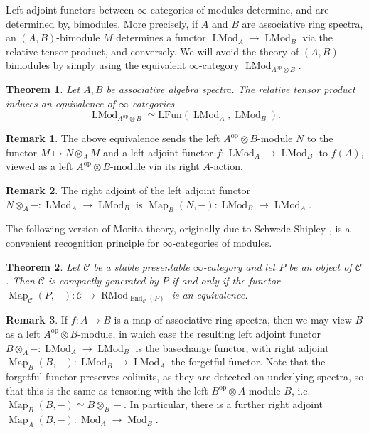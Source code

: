 \documentclass{article}
\newtheorem{theorem}{Theorem}[subsection]
\theoremstyle{definition}
\newtheorem{remark}{Remark}[subsection]
\newcommand{\C}{\mathcal{C}}
\renewcommand{\i}{\infty}
\newcommand{\op}{\mathrm{op}}
\DeclareMathOperator{\LMod}{LMod}
\DeclareMathOperator{\RMod}{RMod}
\DeclareMathOperator{\Mod}{Mod}
\DeclareMathOperator{\End}{End}
\newcommand{\Funl}{\mathrm{LFun}}
\DeclareMathOperator{\Map}{Map}
\begin{document}
Left adjoint functors between $\i$-categories of modules determine, and are determined by, bimodules.
More precisely, if $A$ and $B$ are associative ring spectra, an $(A,B)$-bimodule $M$ determines a functor $\LMod_A\to\LMod_B$ via the relative tensor product, and conversely.
We will avoid the theory of $(A,B)$-bimodules by simply using the equivalent $\infty$-category $\LMod_{A^{\op}\otimes B}$.
\begin{theorem}{\em \cite[Theorem 7.1.2.4]{HA}}
Let $A, B$ be associative algebra spectra.
The relative tensor product induces an equivalence of $\i$-categories
\[
\LMod_{A^{\op}\otimes B}\simeq\Funl(\LMod_A,\LMod_B).
\]
\end{theorem}
\begin{remark}
The above equivalence sends the left $A^{\op}\otimes B$-module $N$ to the functor $M\mapsto N\otimes_A M$ and a left adjoint functor $f:\LMod_A\to\LMod_B$ to $f(A)$, viewed as a left $A^{\op}\otimes B$-module via its right $A$-action.
\end{remark}

\begin{remark}
The right adjoint of the left adjoint functor $N\otimes_A -:\LMod_A\to\LMod_B$ is $\Map_B(N,-):\LMod_B\to\LMod_A$.
\end{remark}

The following version of Morita theory, originally due to Schwede-Shipley \cite{SS}, is a convenient recognition principle for $\infty$-categories of modules.

\begin{theorem}{\em \cite[Theorem 7.1.2.1]{HA}}
Let $\C$ be a stable presentable $\infty$-category and let $P$ be an object of $\C$. Then $\C$ is compactly generated by $P$ if and only if the functor $\Map_{\C}(P,-)\colon  \C\to\RMod_{\End_{\C}(P)}$ is an equivalence.
\end{theorem}

\begin{remark}
If $f:A\to B$ is a map of associative ring spectra, then we may view $B$ as a left $A^{\op}\otimes B$-module, in which case the resulting left adjoint functor $B\otimes_A -:\LMod_A\to\LMod_B$ is the basechange functor, with right adjoint $\Map_B(B,-):\LMod_B\to\LMod_A$ the forgetful functor.
Note that the forgetful functor preserves colimits, as they are detected on underlying spectra, so that this is the same as tensoring with the left $B^{\op}\otimes A$-module $B$, i.e. $\Map_B(B,-)\simeq B\otimes_B -$.
In particular, there is a further right adjoint $\Map_A(B,-):\Mod_A\to\Mod_B$.
\end{remark}
\end{document}
